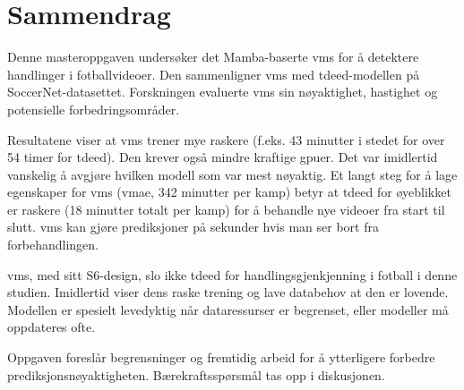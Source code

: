 \chapter*{Sammendrag}

Denne masteroppgaven undersøker det Mamba-baserte \acrfull{vms} for å detektere handlinger i fotballvideoer. Den sammenligner \acrfull{vms} med \acrfull{tdeed}-modellen på SoccerNet-datasettet. Forskningen evaluerte \acrshort{vms} sin nøyaktighet, hastighet og potensielle forbedringsområder.

Resultatene viser at \acrshort{vms} trener mye raskere (f.eks. 43 minutter i stedet for over 54 timer for \acrshort{tdeed}). Den krever også mindre kraftige \acrfull{gpu}er. Det var imidlertid vanskelig å avgjøre hvilken modell som var mest nøyaktig. Et langt steg for å lage egenskaper for \acrshort{vms} (\acrfull{vmae}, 342 minutter per kamp) betyr at \acrshort{tdeed} for øyeblikket er raskere (18 minutter totalt per kamp) for å behandle nye videoer fra start til slutt. \acrshort{vms} kan gjøre prediksjoner på sekunder hvis man ser bort fra forbehandlingen.

\acrshort{vms}, med sitt S6-design, slo ikke \acrshort{tdeed} for handlingsgjenkjenning i fotball i denne studien. Imidlertid viser dens raske trening og lave databehov at den er lovende. Modellen er spesielt levedyktig når dataressurser er begrenset, eller modeller må oppdateres ofte.

Oppgaven foreslår begrensninger og fremtidig arbeid for å ytterligere forbedre prediksjonsnøyaktigheten. Bærekraftsspørsmål tas opp i diskusjonen.

